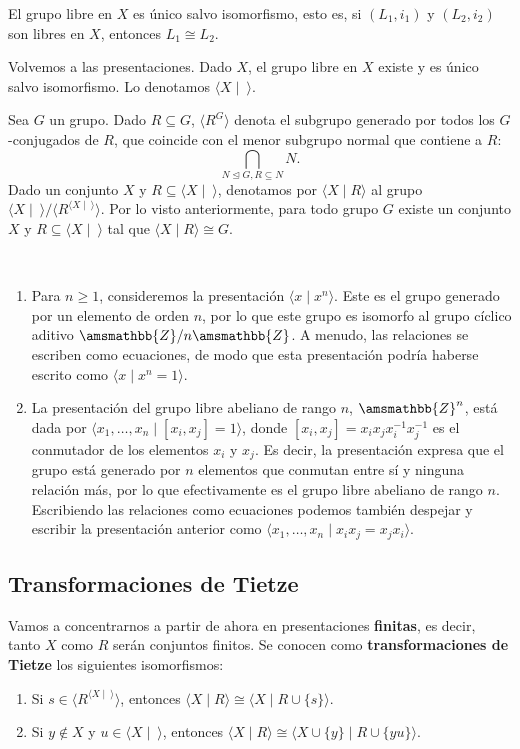 \documentclass[bibtex, anon]{TEMat-article}
\newcommand{\Z}{\amsmathbb{Z}}
\providecommand{\gene}[1]{\langle{#1}\rangle}
\begin{document}
\begin{ejemplo}
	El grupo libre en $X$ es único salvo isomorfismo, esto es, si $(L_1,i_1)$ y $(L_2,i_2)$ son libres en $X$, entonces $L_1\cong L_2$.
	\end{ejemplo}

Volvemos a las presentaciones. Dado $X$, el grupo libre en $X$ existe y es único salvo isomorfismo. Lo denotamos $\gene{X\mid\ }$. 

Sea $G$ un grupo. Dado $R\subseteq G$, $\gene{R^G}$ denota el subgrupo generado por todos los $G$-conjugados de $R$, que coincide con el menor subgrupo normal que contiene a $R$: $$\bigcap_{N\trianglelefteq G, R\subseteq N} N.$$
Dado un conjunto $X$ y $R\subseteq\gene{X\mid\ }$, denotamos por $\gene{X\mid R}$ al grupo $\gene{X\mid\ }/\gene{R^{\gene{X\mid\ }}}$. Por lo visto anteriormente, para todo grupo $G$ existe un conjunto $X$ y $R\subseteq\gene{X\mid\ }$ tal que $\gene{X\mid R}\cong G$.

\begin{ejemplo}\
	\begin{enumerate}[label=\roman*]
		\item Para $n\geq 1$, consideremos la presentación $\gene{x\mid x^n}$. Este es el grupo generado por un elemento de orden $n$, por lo que este grupo es isomorfo al grupo cíclico aditivo $\Z/n\Z$. A menudo, las relaciones se escriben como ecuaciones, de modo que esta presentación podría haberse escrito como $\gene{x\mid x^n=1}$. 
	\item  La presentación del grupo libre abeliano de rango $n$, $\Z^n$, está dada por $\gene{x_1,\dots, x_n\mid [x_i,x_j]=1}$, donde $[x_i,x_j]=x_ix_jx_i^{-1}x_j^{-1}$ es el conmutador de los elementos $x_i$ y $x_j$. Es decir, la presentación expresa que el grupo está generado por $n$ elementos que conmutan entre sí y ninguna relación más, por lo que efectivamente es el grupo libre abeliano de rango $n$. Escribiendo las relaciones como ecuaciones podemos también despejar y escribir la presentación anterior como $\gene{x_1,\dots, x_n\mid x_ix_j=x_jx_i}$. 
	\end{enumerate}
	\end{ejemplo}

\subsection{Transformaciones de Tietze}

Vamos a concentrarnos a partir de ahora en presentaciones \textbf{finitas}, es decir, tanto $X$ como $R$ serán conjuntos finitos. Se conocen como \textbf{transformaciones de Tietze} los siguientes isomorfismos:
\begin{enumerate}
	\item Si $s\in \gene{R^{\gene{X\mid\ }}}$, entonces $\gene{X\mid R}\cong\gene{X\mid R\cup\{s\}}$.
	\item Si $y\notin X$ y $u\in\gene{X\mid\ }$, entonces $\gene{X\mid R}\cong \gene{X\cup \{y\}\mid R\cup \{yu\}}$.
\end{enumerate}
\end{document}
